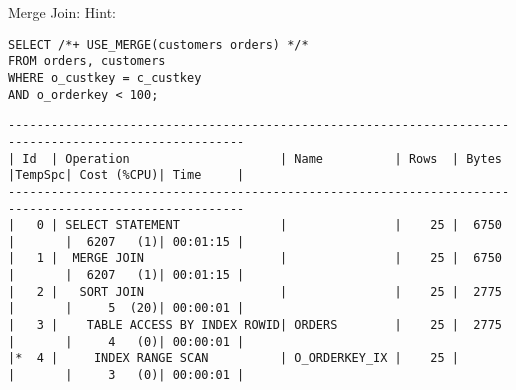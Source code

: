 \documentclass[11pt,a4paper,parskip=half]{scrartcl}
\begin{document}
Merge Join:
Hint:
\begin{lstlisting}
SELECT /*+ USE_MERGE(customers orders) */*
FROM orders, customers
WHERE o_custkey = c_custkey
AND o_orderkey < 100;
\end{lstlisting}
\begin{lstlisting}
-------------------------------------------------------------------------------------------------------                                                                                                                                                                                                      
| Id  | Operation                     | Name          | Rows  | Bytes |TempSpc| Cost (%CPU)| Time     |                                                                                                                                                                                                      
-------------------------------------------------------------------------------------------------------                                                                                                                                                                                                      
|   0 | SELECT STATEMENT              |               |    25 |  6750 |       |  6207   (1)| 00:01:15 |                                                                                                                                                                                                      
|   1 |  MERGE JOIN                   |               |    25 |  6750 |       |  6207   (1)| 00:01:15 |                                                                                                                                                                                                      
|   2 |   SORT JOIN                   |               |    25 |  2775 |       |     5  (20)| 00:00:01 |                                                                                                                                                                                                      
|   3 |    TABLE ACCESS BY INDEX ROWID| ORDERS        |    25 |  2775 |       |     4   (0)| 00:00:01 |                                                                                                                                                                                                      
|*  4 |     INDEX RANGE SCAN          | O_ORDERKEY_IX |    25 |       |       |     3   (0)| 00:00:01 |                                                                                                                                                                                                      

\end{lstlisting}
\end{document}
